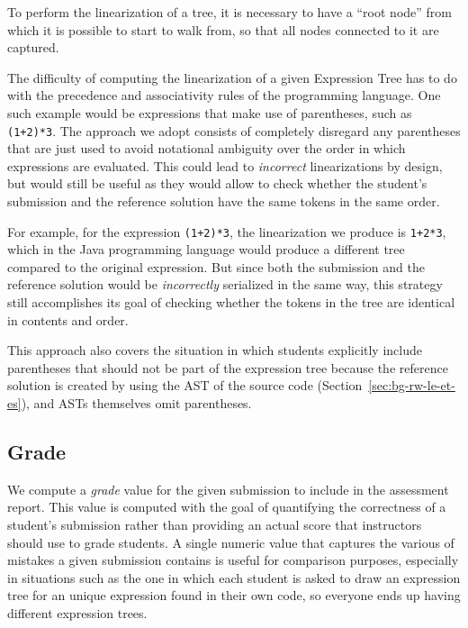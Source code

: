 \begin{chapterBody}
To perform the linearization of a tree, it is necessary to have a ``root node''
from which it is possible to start to walk from, so that all nodes connected
to it are captured.

The difficulty of computing the linearization of a given Expression Tree has to
do with the precedence and associativity rules of the programming language.
One such example would be expressions that make use of parentheses, such as
\lstinline{(1+2)*3}. 
The approach we adopt consists of completely disregard any parentheses that are
just used to avoid notational ambiguity over the order in which expressions are
evaluated. This could lead to \textit{incorrect} linearizations by design, but
would still be useful as they would allow to check whether the
student's submission and the reference solution have the same tokens in the same
order.

For example, for the expression \lstinline{(1+2)*3}, the linearization we produce
is \lstinline{1+2*3}, which in the Java programming language would produce a 
different tree compared to the original expression. But since both the submission
and the reference solution would be \textit{incorrectly} serialized in the
same way, this strategy still accomplishes its goal of checking whether
the tokens in the tree are identical in contents and order.

This approach also covers the situation in which students explicitly
include parentheses that should not be part of the expression tree because
the reference solution is created by using the AST of the source code
(Section~\ref{sec:bg-rw-le-et-es}), and ASTs themselves omit parentheses.



\subsection{Grade}\label{sec:fb-assess-grade}

We compute a \textit{grade} value for the given submission to include in the
assessment report. This value is computed with the goal of quantifying the
correctness of a student's submission rather than providing an actual score
that instructors should use to grade students. A single numeric value that
captures the various of mistakes a given submission contains is useful for 
comparison purposes, especially in situations such as the one in which each
student is asked to draw an expression tree for an unique expression found in
their own code, so everyone ends up having different expression trees.


\end{chapterBody}
